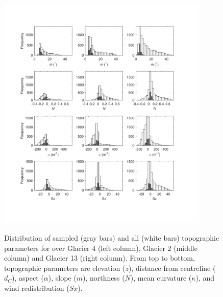 \documentclass[onecolumn, letterpaper]{igs}
\begin{document}
\begin{figure}[]
\centering
	\includegraphics[width =0.9\textwidth]{TopoParamsSampled2.pdf}\\
	\caption{Distribution of sampled (gray bars) and all (white bars) topographic parameters for over Glacier 4 (left column), Glacier 2 (middle column) and Glacier 13 (right column). From top to bottom, topographic parameters are elevation ($z$), distance from centreline ($d_C$), aspect ($\alpha$), slope ($m$), northness ($N$), mean curvature ($\kappa$), and wind redistribution ($Sx$).}
	\label{fig:TopoParamsSampled2}
\end{figure}
\end{document}
